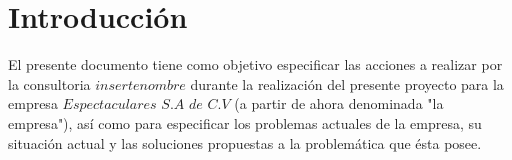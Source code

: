 \section{Introducción}

\label{sec:introduction}
El presente documento tiene como objetivo especificar las acciones a realizar por la consultoria $inserte nombre$ durante la realización del presente proyecto para la empresa $Espectaculares$ $S.A$ $ de $ $C.V$ (a partir de ahora denominada "la empresa"), así como para especificar los problemas actuales de la empresa, su situación actual y las soluciones propuestas a la problemática que ésta posee. 